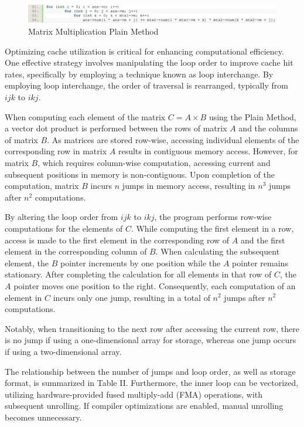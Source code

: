 \documentclass[conference]{IEEEtran}
\begin{document}
\begin{figure}[htbp]
\centering
\includegraphics [width=0.95\linewidth]{pictures/plain.png}
\caption{Matrix Multiplication Plain Method}
\label{fig9}
\end{figure}

Optimizing cache utilization is critical for enhancing computational efficiency. One effective strategy involves manipulating the loop order to improve cache hit rates, specifically by employing a technique known as loop interchange. By employing loop interchange, the order of traversal is rearranged, typically from $ijk$ to $ikj$.

When computing each element of the matrix \( C = A \times B \) using the Plain Method, a vector dot product is performed between the rows of matrix \( A \) and the columns of matrix \( B \). As matrices are stored row-wise, accessing individual elements of the corresponding row in matrix \( A \) results in contiguous memory access. However, for matrix \( B \), which requires column-wise computation, accessing current and subsequent positions in memory is non-contiguous. Upon completion of the computation, matrix \( B \) incurs \( n \) jumps in memory access, resulting in \( n^3 \) jumps after \( n^2 \) computations.

By altering the loop order from \( ijk \) to \( ikj \), the program performs row-wise computations for the elements of \( C \). While computing the first element in a row, access is made to the first element in the corresponding row of \( A \) and the first element in the corresponding column of \( B \). When calculating the subsequent element, the \( B \) pointer increments by one position while the \( A \) pointer remains stationary. After completing the calculation for all elements in that row of \( C \), the \( A \) pointer moves one position to the right. Consequently, each computation of an element in \( C \) incurs only one jump, resulting in a total of \( n^2 \) jumps after \( n^2 \) computations.

Notably, when transitioning to the next row after accessing the current row, there is no jump if using a one-dimensional array for storage, whereas one jump occurs if using a two-dimensional array.

The relationship between the number of jumps and loop order, as well as storage format, is summarized in Table II. Furthermore, the inner loop can be vectorized, utilizing hardware-provided fused multiply-add (FMA) operations, with subsequent unrolling. If compiler optimizations are enabled, manual unrolling becomes unnecessary.
\end{document}

